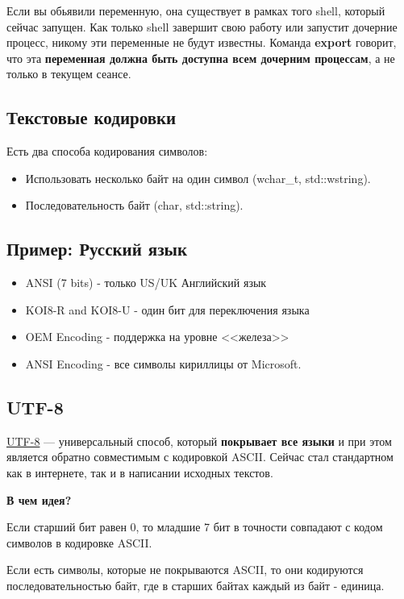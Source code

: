 Если вы обьявили переменную, она существует в рамках того shell, который сейчас запущен. Как только shell завершит свою работу или запустит дочерние процесс, никому эти переменные не будут известны. Команда \textbf{export} говорит, что эта \textbf{переменная должна быть доступна всем дочерним процессам}, а не только в текущем сеансе. 


\subsection{Текстовые кодировки}

Есть два способа кодирования символов:
\begin{itemize}
	\item Использовать несколько байт на один символ (wchar\_t, std::wstring). 
	\item Последовательность байт (char, std::string).
\end{itemize}

\subsection{Пример: Русский язык}

\begin{itemize}
	\item ANSI (7 bits)  - только US/UK Английский язык
	\item KOI8-R and KOI8-U - один бит для переключения языка
	\item OEM Encoding - поддержка на уровне <<железа>>
	\item ANSI Encoding - все символы кириллицы от Microsoft.
\end{itemize}

\subsection{UTF-8}

\begin{Def}
	\underline{UTF-8} --- универсальный способ, который \textbf{покрывает все языки} и при этом является обратно совместимым с кодировкой ASCII. Сейчас стал стандартном как в интернете, так и в написании исходных текстов.
\end{Def} 

\textbf{В чем идея?}

Если старший бит равен 0, то младшие 7 бит в точности совпадают с кодом символов в кодировке ASCII.

Если есть символы, которые не покрываются ASCII, то они кодируются последовательностью байт, где в старших байтах каждый из байт - единица. 

